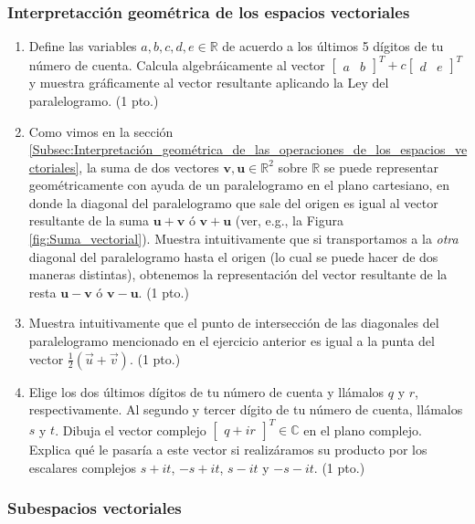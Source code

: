 \documentclass[12pt]{article}
\begin{document}
\subsubsection{Interpretacción geométrica de los espacios vectoriales}

\begin{enumerate}
        \item Define las variables $a,b,c,d,e\in\mathbb{R}$ de acuerdo a los últimos 5 dígitos de tu número de cuenta. Calcula algebráicamente al vector $\begin{bmatrix}a & b\end{bmatrix}^T+c\begin{bmatrix}d & e\end{bmatrix}^T$ y muestra gráficamente al vector resultante aplicando la Ley del paralelogramo. (1 pto.)
                \item Como vimos en la sección \ref{Subsec:Interpretación_geométrica_de_las_operaciones_de_los_espacios_vectoriales}, la suma de dos vectores $\mathbf{v},\mathbf{u}\in\mathbb{R}^2$ sobre $\mathbb{R}$ se puede representar geométricamente con ayuda de un paralelogramo en el plano cartesiano, en donde la diagonal del paralelogramo que sale del origen es igual al vector resultante de la suma $\mathbf{u}+\mathbf{v}$ ó $\mathbf{v}+\mathbf{u}$ (ver, e.g., la Figura \ref{fig:Suma_vectorial}). Muestra intuitivamente que si transportamos a la \emph{otra} diagonal del paralelogramo hasta el origen (lo cual se puede hacer de dos maneras distintas), obtenemos la representación del vector resultante de la resta $\mathbf{u}-\mathbf{v}$ ó $\mathbf{v}-\mathbf{u}$. (1 pto.)
                        \item Muestra intuitivamente que el punto de intersección de las diagonales del paralelogramo mencionado en el ejercicio anterior es igual a la punta del vector $\frac{1}{2}(\vec{u}+\vec{v})$. (1 pto.)
                                \item Elige los dos últimos dígitos de tu número de cuenta y llámalos $q$ y $r$, respectivamente. Al segundo y tercer dígito de tu número de cuenta, llámalos $s$ y $t$. Dibuja el vector complejo $\begin{bmatrix} q + ir \end{bmatrix}^T\in\mathbb{C}$ en el plano complejo. Explica qué le pasaría a este vector si realizáramos su producto por los escalares complejos $s+it$, $-s+it$, $s-it$ y $-s-it$. (1 pto.)
\end{enumerate}

\subsubsection{Subespacios vectoriales}
\end{document}
